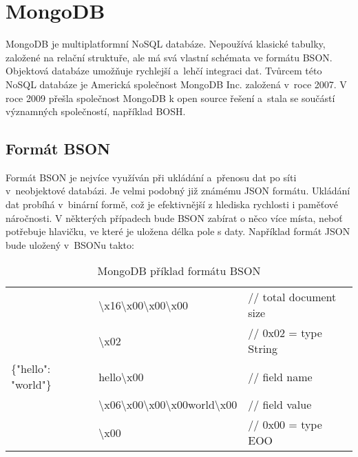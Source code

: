 \section {MongoDB}
\par MongoDB\cite{mongodb} je multiplatformní NoSQL databáze. Nepoužívá klasické tabulky, založené na relační struktuře, ale má svá vlastní schémata ve formátu BSON\cite{mongogbinc}. Objektová databáze umožňuje rychlejší a~lehčí integraci dat. Tvůrcem této NoSQL databáze je Americká společnost MongoDB\cite{mongodb} Inc. založená v~roce 2007. V roce 2009 přešla společnost MongoDB\cite{mongodb} k open source řešení a~stala se součástí významných společností, například BOSH.
\subsection {Formát BSON}
\par Formát BSON\cite{mongogbinc} je nejvíce využíván při ukládání a~přenosu dat po síti v~neobjektové databázi. Je velmi podobný již známému JSON formátu. Ukládání dat probíhá v~binární formě, což je efektivnější z hlediska rychlosti i paměťové náročnosti. V některých případech bude BSON zabírat o něco více místa, neboť potřebuje hlavičku, ve které je uložena délka pole s daty.
Například formát JSON bude uložený v~BSON\cite{mongogbinc}u takto: 

\begin{table}[h]
\begin{tabulary}{\textwidth} {| l | l | l |}
 						& \textbackslash{x}16\textbackslash{x}00\textbackslash{x}00\textbackslash{x}00 								&// total document size \\
 						& \textbackslash{x}02 																						&// 0x02 = type String\\
\{"hello": "world"\} 	& hello\textbackslash{x}00 																					&// field name\\
 						& \textbackslash{x}06\textbackslash{x}00\textbackslash{x}00\textbackslash{x}00world\textbackslash{x}00 		&// field value\\
 						& \textbackslash{x}00 																						&// 0x00 = type EOO \\
\end{tabulary}
\caption[MongoDB příklad formátu BSON]{MongoDB příklad formátu BSON}\label{tab:bson}
\end{table}
\vfill